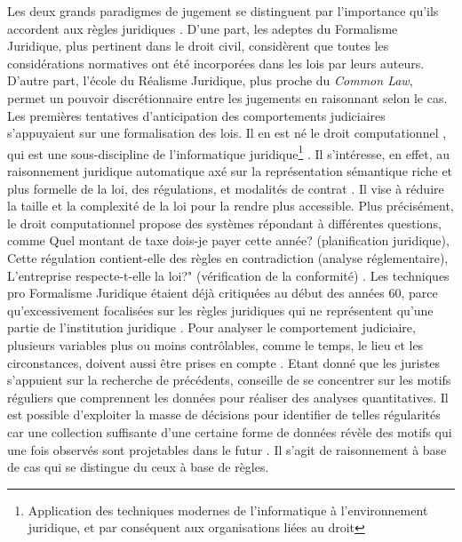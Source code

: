 Les deux grands paradigmes de jugement se distinguent par l'importance qu'ils accordent aux règles juridiques \citep{tumonis2012legalrealism}. D'une part, les adeptes du Formalisme Juridique, plus pertinent dans le droit civil, considèrent que toutes les considérations normatives ont été incorporées dans les lois par leurs auteurs. D'autre part, l'école du Réalisme Juridique, plus proche du \og \textit{Common Law}\fg{}, permet un pouvoir discrétionnaire entre les jugements en raisonnant selon le cas. Les premières tentatives d'anticipation des comportements judiciaires s'appuyaient sur une formalisation des lois. Il en est né le \og droit computationnel \fg{}, qui est une sous-discipline de  l'\og informatique juridique\footnote{Application des techniques modernes de l'informatique à l'environnement juridique, et par conséquent aux organisations liées au droit} \fg{}. Il  s'intéresse, en effet, au raisonnement juridique automatique axé sur la représentation sémantique riche et plus formelle de la loi, des régulations, et modalités de contrat \citep{love2005computationallaw}. Il vise à réduire la taille et la complexité de la loi pour la rendre plus accessible. Plus précisément, le \og droit computationnel \fg{} propose des systèmes répondant à différentes questions, comme \og Quel montant de taxe dois-je payer cette année? \fg{} (planification juridique), \og Cette régulation contient-elle des règles en contradiction\fg{} (analyse réglementaire),  \og L'entreprise respecte-t-elle la loi?" (vérification de la conformité) \citep{Genesereth2015computationallaw}. Les techniques pro Formalisme Juridique étaient déjà critiquées au début des années 60, parce qu'excessivement focalisées sur les règles juridiques qui ne représentent qu'une partie de l'institution juridique \citep{llewellyn1962jurisprudence}. Pour analyser le comportement judiciaire, plusieurs variables plus ou moins contrôlables, comme le temps, le lieu et les circonstances, doivent aussi être prises en compte \citep{ulmer1963quantitative}. Etant donné que les juristes s'appuient sur la recherche de précédents, \citet{ulmer1963quantitative} conseille de se concentrer sur les motifs réguliers que comprennent les données pour réaliser des analyses quantitatives. Il est possible d'exploiter la masse de décisions pour identifier de telles régularités car une collection suffisante d'une certaine forme de données révèle des motifs qui une fois observés sont projetables dans le futur \citep{ulmer1963quantitative}. Il s'agit de raisonnement à base de cas qui se distingue du ceux à base de règles.

